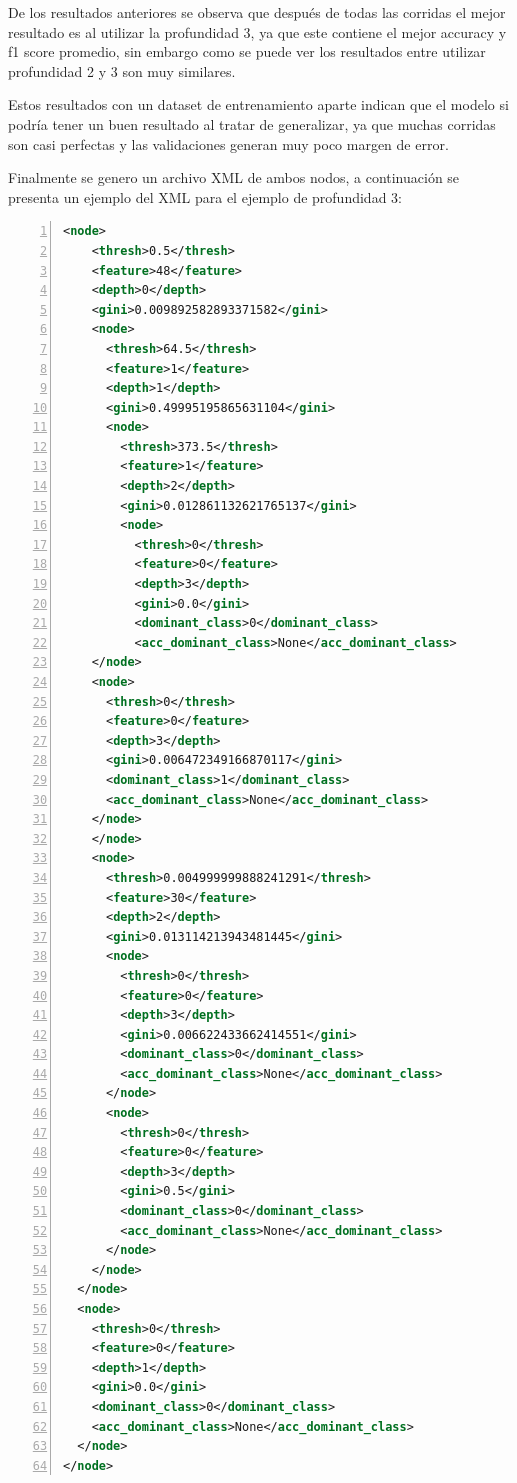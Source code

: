 \documentclass[12pt,a4paper]{article}
\begin{document}
De los resultados anteriores se observa que después de todas las corridas el mejor resultado es al utilizar la profundidad 3,
ya que este contiene el mejor accuracy y f1 score promedio, sin embargo como se puede ver los resultados entre utilizar
profundidad 2 y 3 son muy similares.

Estos resultados con un dataset de entrenamiento aparte indican que el modelo si podría tener un buen resultado al tratar de generalizar,
ya que muchas corridas son casi perfectas y las validaciones generan muy poco margen de error.

Finalmente se genero un archivo XML de ambos nodos, a continuación se presenta un ejemplo del XML para el ejemplo de profundidad 3:

    \begin{lstlisting}[language=XML, numbers=left, basicstyle=\ttfamily\small,label={lst:lstlisting8}]
  <node>
    <thresh>0.5</thresh>
    <feature>48</feature>
    <depth>0</depth>
    <gini>0.009892582893371582</gini>
    <node>
      <thresh>64.5</thresh>
      <feature>1</feature>
      <depth>1</depth>
      <gini>0.49995195865631104</gini>
      <node>
        <thresh>373.5</thresh>
        <feature>1</feature>
        <depth>2</depth>
        <gini>0.012861132621765137</gini>
        <node>
          <thresh>0</thresh>
          <feature>0</feature>
          <depth>3</depth>
          <gini>0.0</gini>
          <dominant_class>0</dominant_class>
          <acc_dominant_class>None</acc_dominant_class>
    </node>
    <node>
      <thresh>0</thresh>
      <feature>0</feature>
      <depth>3</depth>
      <gini>0.006472349166870117</gini>
      <dominant_class>1</dominant_class>
      <acc_dominant_class>None</acc_dominant_class>
    </node>
    </node>
    <node>
      <thresh>0.004999999888241291</thresh>
      <feature>30</feature>
      <depth>2</depth>
      <gini>0.013114213943481445</gini>
      <node>
        <thresh>0</thresh>
        <feature>0</feature>
        <depth>3</depth>
        <gini>0.006622433662414551</gini>
        <dominant_class>0</dominant_class>
        <acc_dominant_class>None</acc_dominant_class>
      </node>
      <node>
        <thresh>0</thresh>
        <feature>0</feature>
        <depth>3</depth>
        <gini>0.5</gini>
        <dominant_class>0</dominant_class>
        <acc_dominant_class>None</acc_dominant_class>
      </node>
    </node>
  </node>
  <node>
    <thresh>0</thresh>
    <feature>0</feature>
    <depth>1</depth>
    <gini>0.0</gini>
    <dominant_class>0</dominant_class>
    <acc_dominant_class>None</acc_dominant_class>
  </node>
</node>
    \end{lstlisting}
\end{document}
